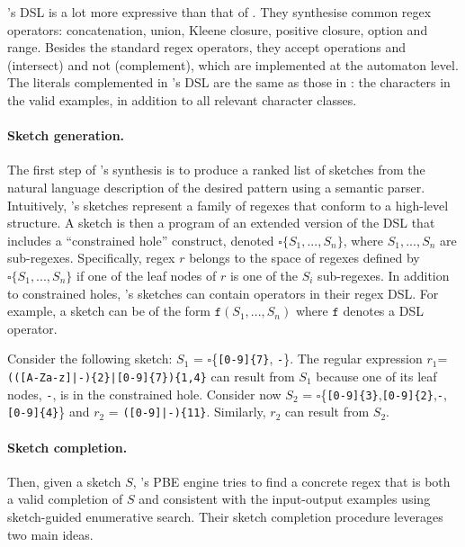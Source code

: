 \Regel's \ac{DSL} is a lot more expressive than that of \AlphaRegex. They synthesise common regex operators: concatenation, union, Kleene closure, positive closure, option and range. Besides the standard regex operators, they accept operations and (intersect) and not (complement), which are implemented at the automaton level. 
The literals complemented in \Regel's \ac{DSL} are the same as those in \Forest: the characters in the valid examples, in addition to all relevant character classes.

\paragraph{Sketch generation.}
The first step of \Regel's synthesis is to produce a ranked list of sketches from the natural language description of the desired pattern using a semantic parser. Intuitively, \Regel's sketches represent a family of regexes that conform to a high-level structure. A sketch is then a program of an extended version of the \ac{DSL} that includes a ``constrained hole'' construct, denoted \(\square\{S_1, ..., S_n\}\), where \(S_1, ..., S_n\) are sub-regexes.
Specifically, regex \(r\) belongs to the space of
regexes defined by \(\square\{S_1, ..., S_n\}\) if one of the leaf nodes of \(r\) is one of the \(S_i\) sub-regexes.
%
In addition to constrained holes, \Regel's sketches can contain operators in their regex DSL. For example, a sketch can be of the form \(\texttt{f}(S_1, ..., S_n)\) where \(\texttt{f}\) denotes a DSL operator.


\begin{example}
Consider the following \Regel sketch:  \(S_1\) = \(\square\)\{\verb`[0-9]{7}`, \texttt{-}\}. The regular expression \(r_1\)=\verb`(([A-Za-z]|-){2}|[0-9]{7}){1,4}` can result from \(S_1\) because one of its leaf nodes, \texttt{-}, is in the constrained hole.
%
Consider now \(S_2\) = \(\square\)\{\verb`[0-9]{3}`,\verb`[0-9]{2}`,\texttt{-},\verb`[0-9]{4}`\} and \(r_2\) = \verb`([0-9]|-){11}`. Similarly, \(r_2\) can result from \(S_2\).
\end{example}

\paragraph{Sketch completion.}
Then, given a sketch \(S\), \Regel's \ac{PBE} engine tries to find a concrete regex that is both a valid completion of \(S\) and consistent with the input-output examples using sketch-guided enumerative search. Their sketch completion procedure leverages two main ideas.

